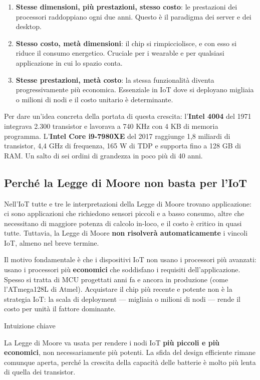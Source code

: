 \documentclass[
  italian,
  openany]{book}
\providecommand{\tightlist}{%
  \setlength{\itemsep}{0pt}\setlength{\parskip}{0pt}}
\begin{document}
\begin{enumerate}
\def\labelenumi{\arabic{enumi}.}
\tightlist
\item
  \textbf{Stesse dimensioni, più prestazioni, stesso costo}: le
  prestazioni dei processori raddoppiano ogni due anni. Questo è il
  paradigma dei server e dei desktop.
\item
  \textbf{Stesso costo, metà dimensioni}: il chip si rimpicciolisce, e
  con esso si riduce il consumo energetico. Cruciale per i wearable e
  per qualsiasi applicazione in cui lo spazio conta.
\item
  \textbf{Stesse prestazioni, metà costo}: la stessa funzionalità
  diventa progressivamente più economica. Essenziale in IoT dove si
  deployano migliaia o milioni di nodi e il costo unitario è
  determinante.
\end{enumerate}

Per dare un'idea concreta della portata di questa crescita:
l'\textbf{Intel 4004} del 1971 integrava 2.300 transistor e lavorava a
740 KHz con 4 KB di memoria programma. L'\textbf{Intel Core i9-7980XE}
del 2017 raggiunge 1,8 miliardi di transistor, 4,4 GHz di frequenza, 165
W di TDP e supporta fino a 128 GB di RAM. Un salto di sei ordini di
grandezza in poco più di 40 anni.

\subsection{Perché la Legge di Moore non basta per
l'IoT}\label{perchuxe9-la-legge-di-moore-non-basta-per-liot}

Nell'IoT tutte e tre le interpretazioni della Legge di Moore trovano
applicazione: ci sono applicazioni che richiedono sensori piccoli e a
basso consumo, altre che necessitano di maggiore potenza di calcolo
in-loco, e il costo è critico in quasi tutte. Tuttavia, la Legge di
Moore \textbf{non risolverà automaticamente} i vincoli IoT, almeno nel
breve termine.

Il motivo fondamentale è che i dispositivi IoT non usano i processori
più avanzati: usano i processori più \textbf{economici} che soddisfano i
requisiti dell'applicazione. Spesso si tratta di MCU progettati anni fa
e ancora in produzione (come l'ATmega128L di Atmel). Acquistare il chip
più recente e potente non è la strategia IoT: la scala di deployment ---
migliaia o milioni di nodi --- rende il costo per unità il fattore
dominante.

\begin{callouttip}{Intuizione chiave}

La Legge di Moore va usata per rendere i nodi IoT \textbf{più piccoli e
più economici}, non necessariamente più potenti. La sfida del design
efficiente rimane comunque aperta, perché la crescita della capacità
delle batterie è molto più lenta di quella dei transistor.

\end{callouttip}
\end{document}
